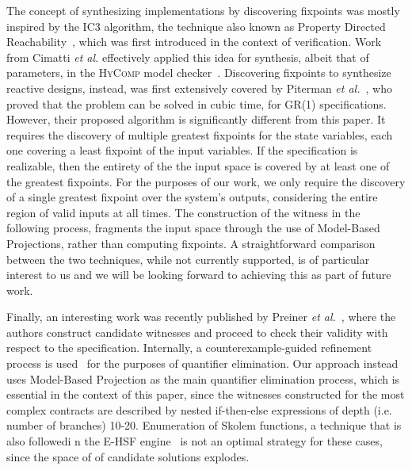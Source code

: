 The concept of synthesizing implementations by discovering fixpoints was mostly
inspired by the IC3 algorithm, the technique also known as Property Directed
Reachability~\cite{bradley2011sat,een2011efficient}, which was first introduced
in the context of verification. Work from Cimatti \textit{et al.} effectively
applied this idea for synthesis, albeit that of parameters, in the
\textsc{HyComp} model checker~\cite{DBLP:conf/fmcad/CimattiGMT13, cimatti2015hycomp}.
Discovering fixpoints to synthesize reactive designs, instead, was first
extensively covered by Piterman \textit{et al.}~\cite{piterman2006synthesis},
who proved that the problem can be solved in cubic time, for GR(1) specifications.
However, their proposed algorithm is significantly different from this paper. It
requires the discovery of multiple greatest fixpoints for the state variables,
each one covering a least fixpoint of the input variables. If the specification
is realizable, then the entirety of the the input space is covered by at least
one of the greatest fixpoints. For the purposes of our work, we only require the
discovery of a single greatest fixpoint over the system's outputs, considering
the entire region of valid inputs at all times. The construction of the witness
in the following process, fragments the input space through the use of Model-Based Projections, rather than computing fixpoints.
A straightforward comparison between the two techniques, while not currently
supported, is of particular interest to us and we will be looking forward to
achieving this as part of future work.

Finally, an interesting work was recently published by Preiner \textit{et
al.}~\cite{preiner2017counterexample}, where the authors construct candidate
witnesses and proceed to check their validity with respect to the specification.
Internally, a counterexample-guided refinement process is
used~\cite{reynolds2015counterexample} for the purposes of quantifier
elimination. Our approach instead uses Model-Based Projection as the main
quantifier elimination process, which is essential in the context of this paper,
since the witnesses constructed for the most complex contracts are described by
nested if-then-else expressions of depth (i.e. number of branches) 10-20.
Enumeration of Skolem functions, a technique that is also followedi n the E-HSF
engine~\cite{beyene2014constraint} is not an optimal strategy for these cases,
since the space of of candidate solutions explodes.

